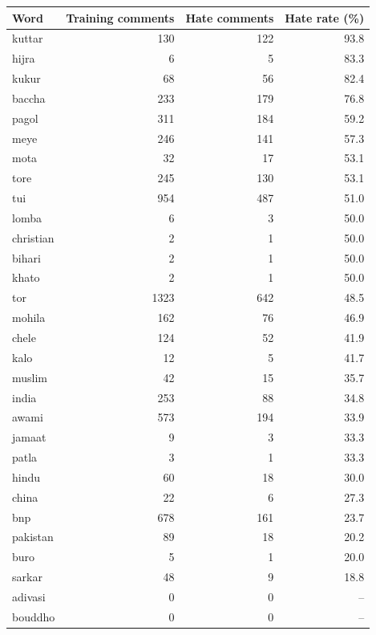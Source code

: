 \begin{tabular}{lrrr}
\toprule
Word & Training comments & Hate comments & Hate rate (\%) \\
\midrule
kuttar & 130 & 122 & 93.8 \\
hijra & 6 & 5 & 83.3 \\
kukur & 68 & 56 & 82.4 \\
baccha & 233 & 179 & 76.8 \\
pagol & 311 & 184 & 59.2 \\
meye & 246 & 141 & 57.3 \\
mota & 32 & 17 & 53.1 \\
tore & 245 & 130 & 53.1 \\
tui & 954 & 487 & 51.0 \\
lomba & 6 & 3 & 50.0 \\
christian & 2 & 1 & 50.0 \\
bihari & 2 & 1 & 50.0 \\
khato & 2 & 1 & 50.0 \\
tor & 1323 & 642 & 48.5 \\
mohila & 162 & 76 & 46.9 \\
chele & 124 & 52 & 41.9 \\
kalo & 12 & 5 & 41.7 \\
muslim & 42 & 15 & 35.7 \\
india & 253 & 88 & 34.8 \\
awami & 573 & 194 & 33.9 \\
jamaat & 9 & 3 & 33.3 \\
patla & 3 & 1 & 33.3 \\
hindu & 60 & 18 & 30.0 \\
china & 22 & 6 & 27.3 \\
bnp & 678 & 161 & 23.7 \\
pakistan & 89 & 18 & 20.2 \\
buro & 5 & 1 & 20.0 \\
sarkar & 48 & 9 & 18.8 \\
adivasi & 0 & 0 & -- \\
bouddho & 0 & 0 & -- \\
\bottomrule
\end{tabular}
